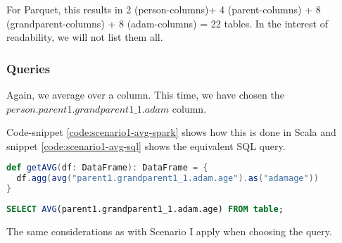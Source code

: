 For Parquet, this results in 2 (person-columns)+ 4 (parent-columns) + 8 (grandparent-columns) + 8 (adam-columns) = 22 tables.
In the interest of readability, we will not list them all.
\subsubsection{Queries}

Again, we average over a column. This time, we have chosen the $person.parent1.grandparent1\_1.adam$ column.

Code-snippet \ref{code:scenario1-avg-spark} shows how this is done in Scala and snippet \ref{code:scenario1-avg-sql} shows the equivalent SQL query.
\begin{lstlisting}[language=Scala,caption=Average over the ID Column in Spark, label=code:scenario1-avg-spark, captionpos=b]
def getAVG(df: DataFrame): DataFrame = {
  df.agg(avg("parent1.grandparent1_1.adam.age").as("adamage"))
}
\end{lstlisting}
\begin{lstlisting}[language=SQL,caption=Equivalent SQL Query, label=code:scenario1-avg-sql, captionpos=b]
  SELECT AVG(parent1.grandparent1_1.adam.age) FROM table;
\end{lstlisting}

The same considerations as with Scenario I apply when choosing the query.